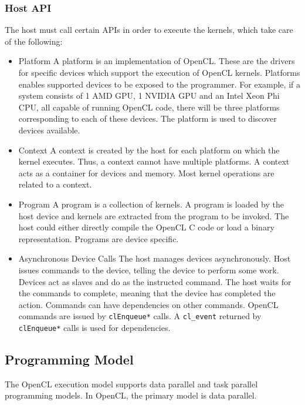 \subsubsection{Host API}
\label{sect4_1_3_2}
The host must call certain APIs in order to execute the kernels, which take care of the following:
\begin{itemize}
\item Platform \newline
A platform is an implementation of OpenCL. These are the drivers for specific devices which support the execution of OpenCL kernels. Platforms enables supported devices to be exposed to the programmer. For example, if a system consists of 1 AMD GPU, 1 NVIDIA GPU and an Intel Xeon Phi CPU, all capable of running OpenCL code, there will be three platforms corresponding to each of these devices. The platform is used to discover devices available.
\item Context \newline
A context is created by the host for each platform on which the kernel executes. Thus, a context cannot have multiple platforms. A context acts as a container for devices and memory. Most kernel operations are related to a context.
\item Program \newline
A program is a collection of kernels. A program is loaded by the host device and kernels are extracted from the program to be invoked. The host could either directly compile the OpenCL C code or load a binary representation. Programs are device specific.
\item Asynchronous Device Calls \newline
The host manages devices asynchronously. Host issues commands to the device, telling the device to perform some work. Devices act as slaves and do as the instructed command. The host waits for the commands to complete, meaning that the device has completed the action. Commands can have dependencies on other commands. OpenCL commands are issued by \verb|clEnqueue*| calls. A \verb|cl_event| returned by \verb|clEnqueue*| calls is used for dependencies.

\end{itemize}

 \subsection{Programming Model}
 \label{sect4_1_4}
The OpenCL execution model supports data parallel and task parallel programming models. In OpenCL, the primary model is data parallel. \newline

